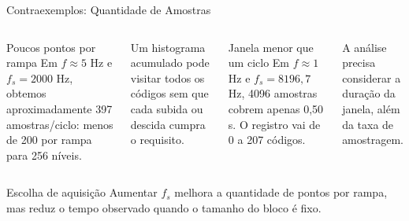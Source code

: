\begin{frame}{Contraexemplos: Quantidade de Amostras}
\begin{columns}[T]
\begin{block}{Poucos pontos por rampa}
Em $f\approx5$ Hz e $f_s=2000$ Hz, obtemos aproximadamente 397 amostras/ciclo: menos de 200 por rampa para 256 níveis.
\end{block}
\small Um histograma acumulado pode visitar todos os códigos sem que cada subida ou descida cumpra o requisito.
\begin{block}{Janela menor que um ciclo}
Em $f\approx1$ Hz e $f_s=8196{,}7$ Hz, 4096 amostras cobrem apenas 0,50 s. O registro vai de 0 a 207 códigos.
\end{block}
\small A análise precisa considerar a duração da janela, além da taxa de amostragem.
\end{columns}
\begin{exampleblock}{Escolha de aquisição}
Aumentar $f_s$ melhora a quantidade de pontos por rampa, mas reduz o tempo observado quando o tamanho do bloco é fixo.
\end{exampleblock}
\end{frame}
